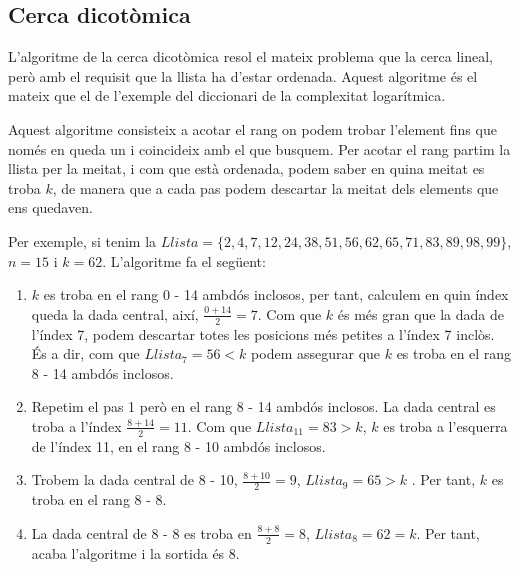 \subsection{Cerca dicotòmica}
L'algoritme de la cerca dicotòmica resol el mateix problema que la cerca lineal, però amb el requisit que la llista ha d'estar ordenada. Aquest algoritme és el mateix que el de l'exemple del diccionari de la complexitat logarítmica. 

Aquest algoritme consisteix a acotar el rang on podem trobar l'element fins que només en queda un i coincideix amb el que busquem. Per acotar el rang partim la llista per la meitat, i com que està ordenada, podem saber en quina meitat es troba $k$, de manera que a cada pas podem descartar la meitat dels elements que ens quedaven.

Per exemple, si tenim la $Llista = \lbrace 2, 4, 7, 12, 24, 38, 51, 56, 62, 65, 71, 83, 89, 98, 99 \rbrace$, $n = 15$ i $k = 62$. L'algoritme fa el següent:

\begin{enumerate}
\item $k$ es troba en el rang 0 - 14 ambdós inclosos, per tant,  calculem en quin índex queda la dada central, així, $\frac{0+14}{2} = 7$. Com que $k$ és més gran que la dada de l'índex 7, podem descartar totes les posicions més petites a l'índex 7 inclòs. És a dir, com que $Llista_7 = 56 < k$  podem assegurar que $k$ es troba en el rang 8 - 14 ambdós inclosos.
\item Repetim el pas 1 però en el rang 8 - 14 ambdós inclosos. La dada central es troba a l'índex $\frac{8+14}{2} = 11$. Com que $Llista_{11} = 83 > k$, $k$ es troba a l'esquerra de l'índex 11, en el rang 8 - 10 ambdós inclosos. 
\item Trobem la dada central de 8 - 10, $\frac{8+10}{2} = 9$, $Llista_9 = 65 > k$ . Per tant, $k$ es troba en el rang 8 - 8.
\item La dada central de 8 - 8 es troba en $\frac{8+8}{2} = 8$, $Llista_8 = 62 = k$. Per tant, acaba l'algoritme i la sortida és 8. 
\end{enumerate}

